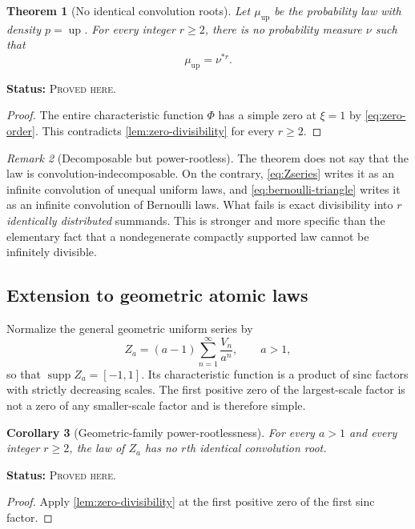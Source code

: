 \documentclass[11pt,oneside]{article}
\newtheorem{theorem}{Theorem}[section]
\newtheorem{corollary}[theorem]{Corollary}
\theoremstyle{definition}
\theoremstyle{remark}
\newtheorem{remark}[theorem]{Remark}
\newcommand{\Up}{\operatorname{up}}
\newcommand{\supp}{\operatorname{supp}}
\newcommand{\ProvedHere}{\textcolor{statusgreen}{\textsc{Proved here}}}
\newcommand{\Status}[1]{\par\smallskip\noindent\textbf{Status:} #1.\par\smallskip}
\begin{document}
\begin{theorem}[No identical convolution roots]\label{thm:rootless}
Let $\mu_{\Up}$ be the probability law with density $p=\Up$.  For every integer
$r\ge2$, there is no probability measure $\nu$ such that
\begin{equation}
 \mu_{\Up}=\nu^{*r}.
\end{equation}
\end{theorem}
\Status{\ProvedHere}

\begin{proof}
The entire characteristic function $\Phi$ has a simple zero at $\xi=1$ by
\eqref{eq:zero-order}.  This contradicts \cref{lem:zero-divisibility} for every
$r\ge2$.
\end{proof}

\begin{remark}[Decomposable but power-rootless]
The theorem does not say that the law is convolution-indecomposable.  On the
contrary, \eqref{eq:Zseries} writes it as an infinite convolution of unequal
uniform laws, and \eqref{eq:bernoulli-triangle} writes it as an infinite convolution
of Bernoulli laws.  What fails is exact divisibility into $r$ \emph{identically
distributed} summands.  This is stronger and more specific than the elementary
fact that a nondegenerate compactly supported law cannot be infinitely divisible.
\end{remark}

\subsection{Extension to geometric atomic laws}
Normalize the general geometric uniform series by
\begin{equation}\label{eq:Za}
 Z_a=(a-1)\sum_{n=1}^{\infty}\frac{V_n}{a^n},\qquad a>1,
\end{equation}
so that $\supp Z_a=[-1,1]$.  Its characteristic function is a product of sinc
factors with strictly decreasing scales.  The first positive zero of the
largest-scale factor is not a zero of any smaller-scale factor and is therefore
simple.

\begin{corollary}[Geometric-family power-rootlessness]\label{cor:rootless-a}
For every $a>1$ and every integer $r\ge2$, the law of $Z_a$ has no $r$th
identical convolution root.
\end{corollary}
\Status{\ProvedHere}

\begin{proof}
Apply \cref{lem:zero-divisibility} at the first positive zero of the first sinc
factor.
\end{proof}
\end{document}
